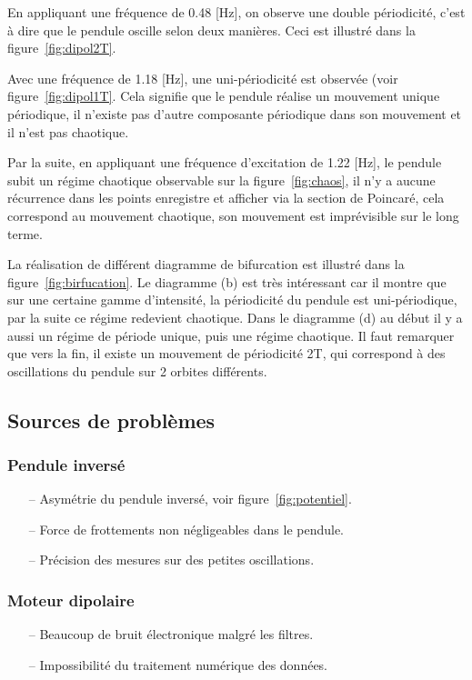 \documentclass[a4paper,12pt,oneside]{article}
\begin{document}
En appliquant une fréquence de 0.48 [Hz], on observe une double périodicité, c'est à dire que le pendule oscille selon deux manières.%
Ceci est illustré dans la figure~\ref{fig:dipol2T}.

Avec une fréquence de 1.18 [Hz], une uni-périodicité est observée (voir figure~\ref{fig:dipol1T}. Cela signifie que le pendule réalise un mouvement unique périodique, il n'existe pas d'autre composante périodique dans son mouvement et il n'est pas chaotique.

Par la suite, en appliquant une fréquence d'excitation de 1.22 [Hz], le pendule subit un régime chaotique observable sur la figure~\ref{fig:chaos}, il n'y a aucune récurrence dans les points enregistre et afficher via la section de Poincaré, cela correspond au mouvement chaotique, son mouvement est imprévisible sur le long terme.


La réalisation de différent diagramme de bifurcation est illustré dans la figure~\ref{fig:birfucation}. Le diagramme (b) est très intéressant car il montre que sur une certaine gamme d'intensité, la périodicité du pendule est uni-périodique, par la suite ce régime redevient chaotique.
Dans le diagramme (d) au début il y a aussi un régime de période unique, puis une régime chaotique. Il faut remarquer que vers la fin, il existe un mouvement de périodicité 2T, qui correspond à des oscillations du pendule sur 2 orbites différents.

\subsection{Sources de problèmes}

\subsubsection{Pendule inversé}
\begin{itemize}
	\item[--] Asymétrie du pendule inversé, voir figure~\ref{fig:potentiel}.
	\item[--] Force de frottements non négligeables dans le pendule.
	\item[--] Précision des mesures sur des petites oscillations.
\end{itemize}

\subsubsection{Moteur dipolaire}
\begin{itemize}
	\item[--] Beaucoup de bruit électronique malgré les filtres.
	\item[--] Impossibilité du traitement numérique des données.

\end{itemize}
\end{document}
